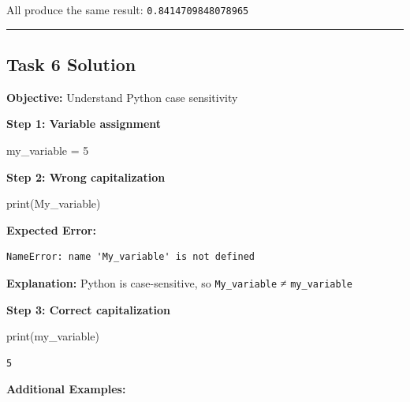 \documentclass[
  11pt,
]{article}
\newenvironment{Shaded}{\begin{snugshade}}{\end{snugshade}}
\newcommand{\BuiltInTok}[1]{\textcolor[rgb]{0.00,0.23,0.31}{#1}}
\newcommand{\DecValTok}[1]{\textcolor[rgb]{0.68,0.00,0.00}{#1}}
\newcommand{\NormalTok}[1]{\textcolor[rgb]{0.00,0.23,0.31}{#1}}
\newcommand{\OperatorTok}[1]{\textcolor[rgb]{0.37,0.37,0.37}{#1}}
\begin{document}
All produce the same result: \texttt{0.8414709848078965}

\begin{center}\rule{0.5\linewidth}{0.5pt}\end{center}

\subsection{Task 6 Solution}\label{task-6-solution}

\textbf{Objective:} Understand Python case sensitivity

\textbf{Step 1: Variable assignment}

\begin{Shaded}
\begin{Highlighting}[]
\NormalTok{my\_variable }\OperatorTok{=} \DecValTok{5}
\end{Highlighting}
\end{Shaded}

\textbf{Step 2: Wrong capitalization}

\begin{Shaded}
\begin{Highlighting}[]
\BuiltInTok{print}\NormalTok{(My\_variable)}
\end{Highlighting}
\end{Shaded}

\textbf{Expected Error:}

\begin{verbatim}
NameError: name 'My_variable' is not defined
\end{verbatim}

\textbf{Explanation:} Python is case-sensitive, so \texttt{My\_variable}
≠ \texttt{my\_variable}

\textbf{Step 3: Correct capitalization}

\begin{Shaded}
\begin{Highlighting}[]
\BuiltInTok{print}\NormalTok{(my\_variable)}
\end{Highlighting}
\end{Shaded}

\begin{verbatim}
5
\end{verbatim}

\textbf{Additional Examples:}
\end{document}
